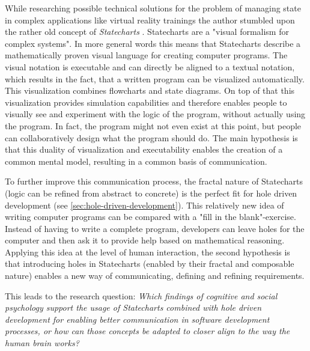 While researching possible technical solutions for the problem of managing state in complex applications like virtual reality trainings the author stumbled upon the rather old concept of \emph{Statecharts} \autocite{harel_statecharts:_1987}. Statecharts are a "visual formalism for complex systems". In more general words this means that Statecharts describe a mathematically proven visual language for creating computer programs. The visual notation is executable and can directly be aligned to a textual notation, which results in the fact, that a written program can be visualized automatically. This visualization combines flowcharts and state diagrams. On top of that this visualization provides simulation capabilities and therefore enables people to visually see and experiment with the logic of the program, without actually using the program. In fact, the program might not even exist at this point, but people can collaboratively design what the program should do. The main hypothesis is that this duality of visualization and executability enables the creation of a common mental model, resulting in a common basis of communication.

To further improve this communication process, the fractal nature of Statecharts (logic can be refined from abstract to concrete) is the perfect fit for hole driven development (see \cref{sec:hole-driven-development}). This relatively new idea of writing computer programs can be compared with a "fill in the blank"-exercise. Instead of having to write a complete program, developers can leave holes for the computer and then ask it to provide help based on mathematical reasoning. Applying this idea at the level of human interaction, the second hypothesis is that introducing holes in Statecharts (enabled by their fractal and composable nature) enables a new way of communicating, defining and refining requirements.

This leads to the research question: \emph{Which findings of cognitive and social psychology support the usage of Statecharts combined with hole driven development for enabling better communication in software development processes, or how can those concepts be adapted to closer align to the way the human brain works?}


